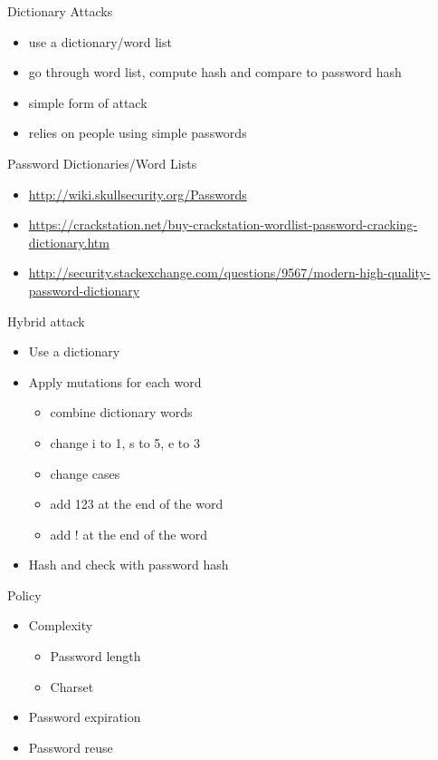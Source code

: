\documentclass{curs}
\begin{document}
\begin{frame}{Dictionary Attacks}
  \begin{itemize}
    \item use a dictionary/word list
    \item go through word list, compute hash and compare to password hash
    \item simple form of attack
    \item relies on people using simple passwords
  \end{itemize}
\end{frame}

\begin{frame}{Password Dictionaries/Word Lists}
  \begin{itemize}
    \item \url{http://wiki.skullsecurity.org/Passwords}
    \item
      \url{https://crackstation.net/buy-crackstation-wordlist-password-cracking-dictionary.htm}
    \item
      \url{http://security.stackexchange.com/questions/9567/modern-high-quality-password-dictionary}
  \end{itemize}
\end{frame}

\begin{frame}{Hybrid attack}
  \begin{itemize}
    \item Use a dictionary
    \item Apply mutations for each word
      \begin{itemize}
       \item combine dictionary words
        \item change i to 1, s to 5, e to 3
        \item change cases
        \item add 123 at the end of the word
        \item add ! at the end of the word
      \end{itemize}
    \item Hash and check with password hash
  \end{itemize}
\end{frame}

\begin{frame}{Policy}
  \begin{itemize}
    \item Complexity
      \begin{itemize}
        \item Password length
        \item Charset
      \end{itemize}
    \item Password expiration
    \item Password reuse
  \end{itemize}
\end{frame}
\end{document}

